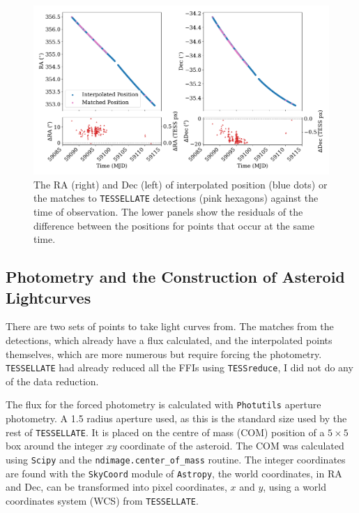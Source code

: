 \documentclass{UCreport}
\begin{document}
\begin{figure}[]
  \centering
  \includegraphics[width =\textwidth]{./Figures/DetectMatchPosUlysses.pdf}
  \caption[Interpolated and \texttt{TESSELLATE} Detected Positions Comparison]{The RA (right) and Dec (left) of interpolated position (blue dots) or the matches to \texttt{TESSELLATE} detections (pink hexagons) against the time of observation. The lower panels show the residuals of the difference between the positions for points that occur at the same time.}
  \label{Fig:RADecMatch}
\end{figure}

\subsection{Photometry and the Construction of Asteroid Lightcurves}\label{SubSec:Lightcurves}

There are two sets of points to take light curves from.
The matches from the detections, which already have a flux calculated, and the interpolated points themselves, which are more numerous but require forcing the photometry.
\texttt{TESSELLATE} had already reduced all the FFIs using \texttt{TESSreduce}, I did not do any of the data reduction.

The flux for the forced photometry is calculated with \texttt{Photutils} \citep{Bradley2024} aperture photometry.
A \qty{1.5}{\px} radius aperture used, as this is the standard size used by the rest of \texttt{TESSELLATE}.
It is placed on the centre of mass (COM) position of a $5\times5$ \unit{\px} box around the integer $xy$ coordinate of the asteroid.
The COM was calculated using \texttt{Scipy} and the \texttt{ndimage.center\_of\_mass} routine.
The integer coordinates are found with the \texttt{SkyCoord} module of \texttt{Astropy}, the world coordinates, in RA and Dec, can be transformed into pixel coordinates, $x$ and $y$, using a world coordinates system (WCS) from \texttt{TESSELLATE}.
\end{document}
